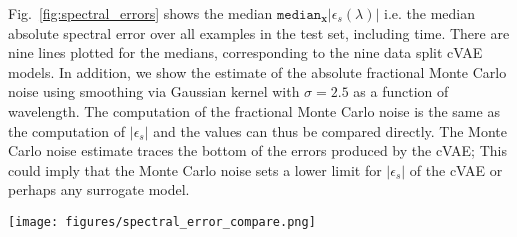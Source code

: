 \documentclass[fleqn,usenatbib,useAMS]{mnras}
\begin{document}
Fig.~\ref{fig:spectral_errors} shows the median  $\texttt{median}_{\mathbf{x}}|\epsilon_s(\lambda)|$ i.e. the median absolute spectral error over all examples in the test set, including time.
There are nine lines plotted for the medians, corresponding to the nine data split cVAE models.
In addition, we show the estimate of the absolute fractional Monte Carlo noise using smoothing via Gaussian kernel with $\sigma=2.5$ as a function of wavelength. 
The computation of the fractional Monte Carlo noise is the same as the computation of $|\epsilon_s|$ and the values can thus be compared directly.
The Monte Carlo noise estimate traces the bottom of the errors produced by the cVAE;
This could imply that the Monte Carlo noise sets a lower limit for $|\epsilon_s|$ of the cVAE or perhaps any surrogate model. 


\begin{figure*}
    \centering
    \texttt{[image: figures/spectral\_error\_compare.png]}
    \caption{Median of $|\epsilon_s|$ over all the spectra in the \emph{Dietrich} data set for the predictions of the cVAE (purple), along with the absolute spectral error from the Gaussian smoothed spectra for a Gaussian kernel with $\sigma=2.5$ (black).}
    \label{fig:spectral_errors}
\end{figure*}
\end{document}

